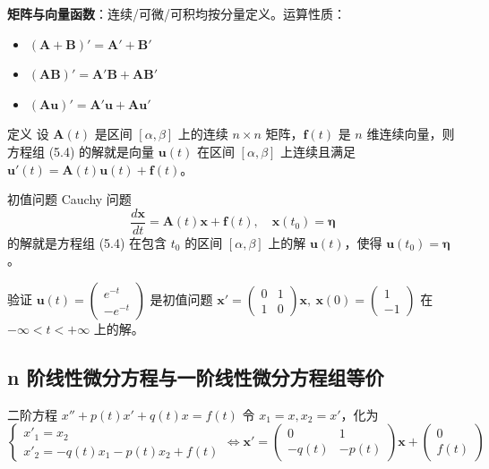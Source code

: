 \textbf{矩阵与向量函数}：连续/可微/可积均按分量定义。运算性质：
\begin{itemize}
    \item $(\mathbf{A} + \mathbf{B})' = \mathbf{A}' + \mathbf{B}'$
    \item $(\mathbf{AB})' = \mathbf{A}'\mathbf{B} + \mathbf{A}\mathbf{B}'$
    \item $(\mathbf{Au})' = \mathbf{A}'\mathbf{u} + \mathbf{A}\mathbf{u}'$
\end{itemize}

\begin{mydefinition}{定义}
设 $\mathbf{A}(t)$ 是区间 $[\alpha, \beta]$ 上的连续 $n\times n$ 矩阵，$\mathbf{f}(t)$ 是 $n$ 维连续向量，则方程组 (5.4) 的解就是向量 $\mathbf{u}(t)$ 在区间 $[\alpha,\beta]$ 上连续且满足 $\mathbf{u}'(t) = \mathbf{A}(t)\mathbf{u}(t) + \mathbf{f}(t)$。
\end{mydefinition}

\begin{mydefinition}{初值问题}
Cauchy 问题
\begin{equation}\frac{d\mathbf{x}}{dt} = \mathbf{A}(t)\mathbf{x} + \mathbf{f}(t), \quad \mathbf{x}(t_0) = \boldsymbol{\eta} \tag{5.5}\end{equation}
的解就是方程组 (5.4) 在包含 $t_0$ 的区间 $[\alpha, \beta]$ 上的解 $\mathbf{u}(t)$，使得 $\mathbf{u}(t_0) = \boldsymbol{\eta}$。
\end{mydefinition}

\begin{example}
验证 $\mathbf{u}(t) = \begin{pmatrix} e^{-t} \\ -e^{-t} \end{pmatrix}$ 是初值问题 $\mathbf{x}' = \begin{pmatrix} 0 & 1 \\ 1 & 0 \end{pmatrix}\mathbf{x}, \ \mathbf{x}(0) = \begin{pmatrix} 1 \\ -1 \end{pmatrix}$ 在 $-\infty < t < +\infty$ 上的解。
\end{example}

\subsection{n 阶线性微分方程与一阶线性微分方程组等价}

\begin{example}
二阶方程 $x'' + p(t)x' + q(t)x = f(t)$ 令 $x_1 = x, x_2 = x'$，化为
$$\begin{cases} x'_1 = x_2 \\ x'_2 = -q(t)x_1 - p(t)x_2 + f(t) \end{cases} \iff \mathbf{x}' = \begin{pmatrix} 0 & 1 \\ -q(t) & -p(t) \end{pmatrix}\mathbf{x} + \begin{pmatrix} 0 \\ f(t) \end{pmatrix}$$
\end{example}

